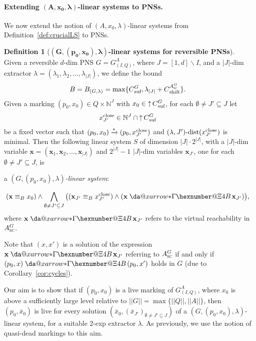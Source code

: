 \documentclass[11pt,a4paper]{amsart}
\makeatletter
\newcommand{\step}[1]{\mathrel{\xrightarrow{#1}}}
\newcommand{\reach}{\step{*}}
\newcommand{\virtual}[1]{\mathrel{\xdashrightarrow{#1}}\hspace{-0.3em}}
\newcommand{\vreach}{\virtual{*}}
\newcommand{\dist}[3]{(#1,#2)\text{-dist}(#3)}
\newcommand{\bvar}[1]{\mathbf{#1}}
\newcommand{\nnorm}[1]{||#1||}
\newcommand{\upC}[1]{\mathop{\uparrow}#1}
\newcommand{\suf}{{}_\textnormal{suf}}
\newcommand{\shift}{{}_\textnormal{shift}}
\newcommand{\close}{\textnormal{close}}
\newcommand{\ASC}{A_{\textsc{sc}}}
\newcommand{\Nat}{\mathbb{N}}
\newcommand{\setN}{\Nat}
\newcommand*{\da@rightarrow}{\mathchar"0\hexnumber@\symAMSa 4B }
\newcommand*{\xdashrightarrow}[2][]{%
  \mathrel{%
    \mathpalette{\da@xarrow{#1}{#2}{}\da@rightarrow{\,}{}}{}%
  }%
}
\newcommand*{\da@xarrow}[7]{%
  \sbox0{$\ifx#7\scriptstyle\scriptscriptstyle\else\scriptstyle\fi#5#1#6\m@th$}%
  \sbox2{$\ifx#7\scriptstyle\scriptscriptstyle\else\scriptstyle\fi#5#2#6\m@th$}%
  \sbox4{$#7\dabar@\m@th$}%
  \dimen@=\wd0 %
  \ifdim\wd2 >\dimen@
    \dimen@=\wd2 %
  \fi
  \count@=2 %
  \def\da@bars{\dabar@\dabar@}%
  \@whiledim\count@\wd4<\dimen@\do{%
    \advance\count@\@ne
    \expandafter\def\expandafter\da@bars\expandafter{%
      \da@bars
      \dabar@ 
    }%
  }%
  \mathrel{#3}%
  \mathrel{%
    \mathop{\da@bars}\limits
    \ifx\\#1\\%
    \else
      _{\copy0}%
    \fi
    \ifx\\#2\\%
    \else
      ^{\copy2}%
    \fi
  }%
  \mathrel{#4}%
}
\let\origtextsc\textsc
\renewcommand{\textsc}[1]{\textnormal{\origtextsc{#1}}}
\theoremstyle{plain}
\theoremstyle{definition}
\newtheorem{defi}[thm]{Definition}
\theoremstyle{defC}
\theoremstyle{thmC}
\makeatother
\begin{document}
\paragraph{Extending $\bm{(A,x_0,\lambda)}$-linear systems to PNSs.}
We now extend the notion of $(A,x_0,\lambda)$-linear systems
from Definition~\ref{def:crucialLS} to PNSs.

\begin{defi}[\textbf{$\bm{(G,(p_0,x_0),\lambda)}$-linear systems for
	reversible PNSs}]\label{def:crucialLSPNS}
\hfill\\
	Given a reversible $d$-dim PNS	$G=G^A_{(I,Q)}$, where
	$J=[1,d]\smallsetminus I$, and a $|J|$-dim extractor
	$\lambda=(\lambda_1,\lambda_2,\dots,\lambda_{|J|})$,
	we define
the bound	\begin{equation}\label{eq:BPNS}
	B=B_{(G,\lambda)}=\max\{C\suf^G,\lambda_{|J|}+C\shift^{\ASC^G}\}.
	\end{equation}
	Given a marking $(p_0,x_0)\in Q\times \setN^J$ 
	with $x_0\in\upC{C\suf^G}$,
	for each $\emptyset\neq J'\subseteq J$ let 
	\[x^\close_{J'}\in \setN^J\cap\upC{C\suf^G}\]
	be a fixed vector such that
	$(p_0,x_0)\reach(p_0,x^\close_{J'})$ and  
	$\dist{\lambda}{J'}{x^\close_{J'}}$ is
	minimal. 
Then the following 
	linear system $S$ of dimension $|J|\cdot 2^{|J|}$, with
	a $|J|$-dim variable
	$\bvar{x}=(\bvar{x}_1,\bvar{x}_2,\dots,\bvar{x}_{|J|})$ and
	$2^{|J|}-1$ $|J|$-dim variables 
	$\bvar{x}_{J'}$, one for each $\emptyset\neq J'\subseteq J$,
	is 
	\begin{center}
		a \emph{$(G,(p_0,x_0),\lambda)$-linear system}:
	\end{center}		
\begin{equation}\label{eq:GxLS}
	(\bvar{x}\equiv_B x_0)
	\land
	\bigwedge_{\emptyset\neq J'\subseteq
	J}\big((\bvar{x}_{J'}\equiv_B x^\close_{J'})\land
	(\bvar{x}\virtual{*}\bvar{x}_{J'})\big),
\end{equation}
	where $\bvar{x}\virtual{*}\bvar{x}_{J'}$ refers to the virtual
	reachability in $\ASC^G$. 
\end{defi}	


\noindent
Note that $(x,x')$ is a solution of the expression
$\bvar{x}\virtual{*}\bvar{x}_{J'}$ referring to $\ASC^G$ if and
only if $(p_0,x)\vreach(p_0,x')$ holds in $G$ (due to Corollary~\ref{cor:cycles}).

Our aim is to show that if $(p_0,x_0)$ is a live marking of
$G^A_{(I,Q)}$, where $x_0$ is above a sufficiently large level
relative to $\nnorm{G}=\max\{\nnorm{Q},\nnorm{A}\}$, then  $(p_0,\bar{x}_0)$ is live for every
solution $(\bar{x}_0,(\bar{x}_{J'})_{\emptyset\neq J'\subseteq J})$
of a $(G,(p_0,x_0),\lambda)$-linear system, for a suitable 2-exp
extractor $\lambda$.
As previously, we use the notion of quasi-dead markings to this aim.
\end{document}
